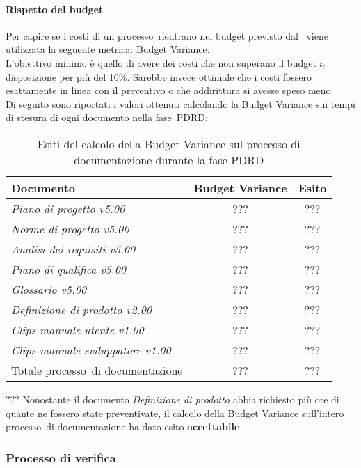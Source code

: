 \documentclass[../PianoDiQualifica.tex]{subfiles}
\begin{document}
\begin{appendices}
			\paragraph{Rispetto del budget}
			Per capire se i costi di un processo\g\ rientrano nel budget previsto dal \pianodiprogetto\ viene utilizzata la seguente metrica: Budget Variance.\\
			L'obiettivo minimo è quello di avere dei costi che non superano il budget a disposizione per più del 10\%. Sarebbe invece ottimale che i costi fossero esattamente in linea con il preventivo o che addirittura si avesse speso meno.\\
			Di seguito sono riportati i valori ottenuti calcolando la Budget Variance sui tempi di stesura di ogni documento nella fase\g\ PDRD:
			\begin{table}[H]
				\centering
				\begin{tabular}{l * {2}{c}}
					\toprule
					\textbf{Documento} & \textbf{Budget Variance} & \textbf{Esito} \\
					\midrule
					\textit{Piano di progetto v5.00} & ??? &  ??? \\
					\textit{Norme di progetto v5.00} & ??? & ??? \\
					\textit{Analisi dei requisiti v5.00} & ??? & ??? \\
					\textit{Piano di qualifica v5.00} & ??? & ??? \\
					\textit{Glossario v5.00} & ??? & ??? \\
					\textit{Definizione di prodotto v2.00} & ??? & ??? \\
					\textit{Clips manuale utente v1.00} & ??? & ??? \\
					\textit{Clips manuale sviluppatore v1.00} & ??? & ??? \\
					Totale processo\g\ di documentazione & ??? & ??? \\
					\bottomrule
				\end{tabular}
				\caption{Esiti del calcolo della Budget Variance sul processo di documentazione durante la fase PDRD}
				\label{tab:esiti_budget_variance}
			\end{table}
			
			??? Nonostante il documento \textit{Definizione di prodotto} abbia richiesto più ore di quante ne fossero state preventivate, il calcolo della Budget Variance sull'intero processo\g\ di documentazione ha dato esito \textbf{accettabile}.
						
		\subsubsection{Processo di verifica}

\end{appendices}
\end{document}
